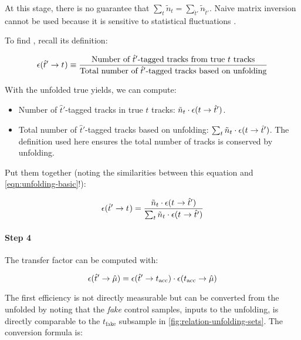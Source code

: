 At this stage, there is no guarantee that
$\sum_t \tilde{n}_t = \sum_{\hat{t}'} \tilde{n}_{\hat{t}'}$.
Naive matrix inversion cannot be used because it is sensitive to statistical
fluctuations \cite{Cowan_1998}.

To find , recall its definition:

\begin{equation}
    \misEff[\hat{t}']{t^{\phantom{}}} \equiv
        \frac{
            \text{Number of $\hat{t}'$-tagged tracks from true $t$ tracks}
        }{
            \text{Total number of $\hat{t}'$-tagged tracks based on unfolding}
        }
\end{equation}

With the unfolded true yields, we can compute:

\begin{itemize}
    \item Number of $\hat{t}'$-tagged tracks in true $t$ tracks:
        $\tilde{n}_t \cdot \misEff[t]{\hat{t}'}$.
    \item Total number of $\hat{t}'$-tagged tracks based on unfolding:
        $\sum_t \tilde{n}_t \cdot \misEff[t]{\hat{t}'}$.
        The definition used here ensures the total number of tracks is
        conserved by unfolding.
\end{itemize}

Put them together (noting the similarities between this equation and
\cref{eqn:unfolding-basic}!):

\begin{equation}
    \misEff[\hat{t}']{t^{\phantom{}}} =
        \frac{
            \tilde{n}_t \cdot \misEff[t^{\phantom{}}]{\hat{t}'}
        }{
            \sum_t \tilde{n}_t \cdot \misEff[t^{\phantom{}}]{\hat{t}'}
        }
\end{equation}

\paragraph{Step 4}
The transfer factor \misEff[\hat{t}']{\hat{\mu}}
can be computed with:

\begin{equation}
    \misEff[\hat{t}']{\hat{\mu}} =
        \misEff[\hat{t}']{t_\text{acc}} \cdot \misEff[t_\text{acc}]{\hat{\mu}}
\end{equation}

The first efficiency  is not directly measurable
but can be converted from the unfolded 
by noting that the \emph{fake} \muon control samples,
inputs to the unfolding,
is directly comparable to the $t_\text{fake}$ subsample
in \cref{fig:relation-unfolding-sets}.
The conversion formula is:

